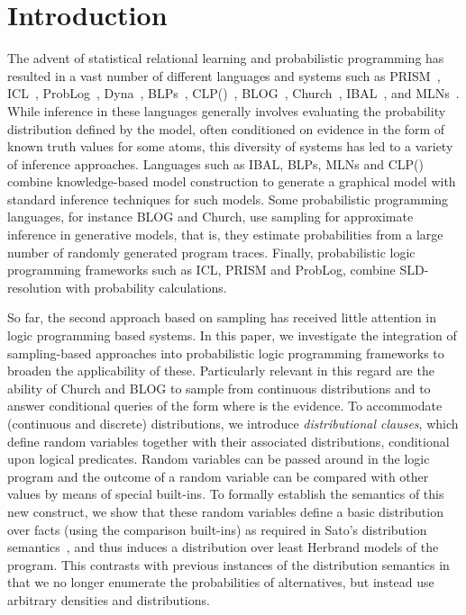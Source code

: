 \documentclass{tlp}
\begin{document}
\section{Introduction} 
The advent of statistical relational learning
\cite{Getoor07,DeRaedtAPRIL08} and probabilistic programming
\cite{NIPSWorkshop} has resulted in a vast number of different languages and systems such as
PRISM~\cite{SatoKameya:01}, ICL~\cite{Poole08},
ProbLog~\cite{DeRaedt07-IJCAIa}, Dyna~\cite{Eisner05},
BLPs~\cite{Kersting08}, CLP()~\cite{clpbn},
BLOG~\cite{Milch05}, Church~\cite{Goodman08}, IBAL~\cite{Pfeffer01},
and MLNs~\cite{Richardson:06}. While inference in these languages
generally involves evaluating the probability distribution defined by
the model, often conditioned on evidence in the form of known truth
values for some atoms, this diversity of systems has led to a variety
of inference approaches.  Languages such as IBAL, BLPs, MLNs and
CLP() combine knowledge-based model construction to
generate a graphical model with standard inference techniques for such
models.  Some probabilistic programming languages, for instance BLOG
and Church, use sampling for approximate inference in generative
models, that is, they estimate probabilities from a large number of
randomly generated program traces. Finally, probabilistic logic
programming frameworks such as ICL, PRISM and ProbLog, combine
SLD-resolution with probability calculations.

So far, the second approach based on sampling has received little
attention in logic programming based systems.  In this paper, we
investigate the integration of sampling-based approaches into
probabilistic logic programming frameworks to broaden the
applicability of these.  Particularly relevant in this regard are the
ability of Church and BLOG to sample from continuous distributions and
to answer conditional queries of the form  where  is the
evidence.  To accommodate (continuous and discrete) distributions, we
introduce \emph{distributional clauses}, which define random variables
together with their associated distributions, conditional upon logical
predicates.  Random variables can be passed around in the logic
program and the outcome of a random variable can be compared with
other values by means of special built-ins.  To formally establish the
semantics of this new construct, we show that these random variables
define a basic distribution over facts (using the comparison
built-ins) as required in Sato's distribution
semantics~\cite{Sato:95}, and thus induces a distribution over least
Herbrand models of the program. This contrasts with previous instances
of the distribution semantics in that we no longer enumerate the
probabilities of alternatives, but instead use arbitrary densities and
distributions. 
\end{document}
